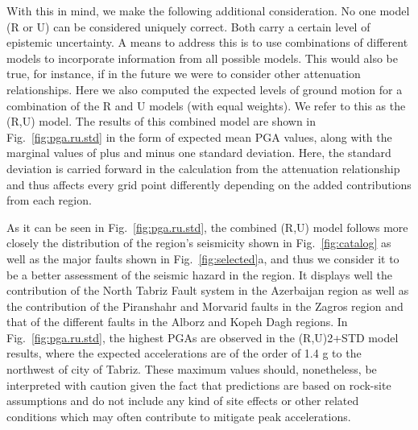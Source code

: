 With this in mind, we make the following additional consideration. No one model (R or U) can be considered uniquely correct. Both carry a certain level of epistemic uncertainty. A means to address this is to use combinations of different models to incorporate information from all possible models. This would also be true, for instance, if in the future we were to consider other attenuation relationships. Here we also computed the expected levels of ground motion for a combination of the R and U models (with equal weights). We refer to this as the (R,U) model. The results of this combined model are shown in Fig.~\ref{fig:pga.ru.std} in the form of expected mean PGA values, along with the marginal values of plus and minus one standard deviation. Here, the standard deviation is carried forward in the calculation from the attenuation relationship and thus affects every grid point differently depending on the added contributions from each region. 

As it can be seen in Fig.~\ref{fig:pga.ru.std}, the combined (R,U) model follows more closely the distribution of the region's seismicity shown in Fig.~\ref{fig:catalog} as well as the major faults shown in Fig.~\ref{fig:selected}a, and thus we consider it to be a better assessment of the seismic hazard in the region. It displays well the contribution of the North Tabriz Fault system in the Azerbaijan region as well as the contribution of the Piranshahr and Morvarid faults in the Zagros region and that of the different faults in the Alborz and Kopeh Dagh regions. In Fig.~\ref{fig:pga.ru.std}, the highest PGAs are observed in the (R,U)2+STD model results, where the expected accelerations are of the order of 1.4 g to the northwest of city of Tabriz. These maximum values should, nonetheless, be interpreted with caution given the fact that predictions are based on rock-site assumptions and do not include any kind of site effects or other related conditions which may often contribute to mitigate peak accelerations.

